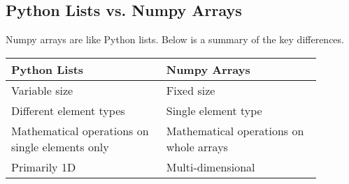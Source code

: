 \subsection{Python Lists vs. Numpy Arrays}
Numpy arrays are like Python lists. Below is a summary of the key differences.
\begin{tabular*}{\linewidth}{m{0.44\linewidth} | m{0.44\linewidth}}
    Python Lists & Numpy Arrays\\
    \hline
    Variable size & Fixed size\\
    \hline
    Different element types & Single element type\\
    \hline
    Mathematical operations on single elements only & Mathematical operations on whole arrays\\
    \hline
    Primarily 1D & Multi-dimensional\\
\end{tabular*}
